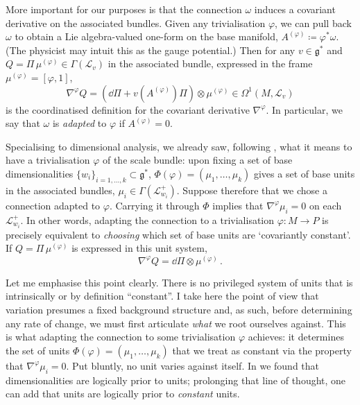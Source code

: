 \documentclass[12pt]{article}
\numberwithin{equation}{section}
\begin{document}
More important for our purposes is that the connection $\omega$ induces a covariant derivative on the associated bundles. Given any trivialisation $\varphi$, we can pull back $\omega$ to obtain a Lie algebra-valued one-form on the base manifold, $A^{(\varphi)}\coloneqq \varphi^* \omega$. (The physicist may intuit this as the gauge potential.) Then for any $v\in\mathfrak{g}^*$ and $Q=\Pi\, \mu^{(\varphi)}\in \Gamma(\mathcal{L}_v)$ in the associated bundle, expressed in the frame $\mu^{(\varphi)}=[\varphi,1]$,
\begin{equation}
    \nabla^\varphi Q=(\dd\Pi + v(A^{(\varphi)})\Pi )\otimes \mu^{(\varphi)} \in \Omega^1(M,\mathcal{L}_v)
\end{equation}
is the coordinatised definition for the covariant derivative $\nabla^\varphi$. In particular, we say that $\omega$ is \emph{adapted} to $\varphi$ if $A^{(\varphi)}=0$. 

Specialising to dimensional analysis, we already saw, following , what it means to have a trivialisation $\varphi$ of the scale bundle: upon fixing a set of base dimensionalities $\{w_i\}_{i=1,\dots,k}\subset \mathfrak{g}^*$, $\mathsf{\Phi}(\varphi)=(\mu_1,\dots,\mu_k)$ gives a set of base units in the associated bundles, $\mu_i\in\Gamma(\mathcal{L}_{w_i}^+)$. Suppose therefore that we chose a connection adapted to $\varphi$. Carrying it through $\mathsf{\Phi}$ implies that $\nabla^\varphi\mu_i=0$ on each $\mathcal{L}_{w_i}^+$. In other words, adapting the connection to a trivialisation $\varphi\colon M\to P$ is precisely equivalent to \emph{choosing} which set of base units are `covariantly constant'. If $Q=\Pi\,\mu^{(\varphi)}$ is expressed in this unit system,
\begin{equation}
    \nabla^\varphi Q = \dd \Pi \otimes \mu^{(\varphi)}\,.
\end{equation}

Let me emphasise this point clearly. There is no privileged system of units that is intrinsically or by definition ``constant''. I take here the point of view that variation presumes a fixed background structure and, as such, before determining any rate of change, we must first articulate \emph{what} we root ourselves against. This is what adapting the connection to some trivialisation $\varphi$ achieves: it determines the set of units $\mathsf{\Phi}(\varphi)=(\mu_1,\dots,\mu_k)$ that we treat as constant via the property that $\nabla^\varphi\mu_i = 0$. Put bluntly, no unit varies against itself. In  we found that dimensionalities are logically prior to units; prolonging that line of thought, one can add that units are logically prior to \emph{constant} units. 
\end{document}
